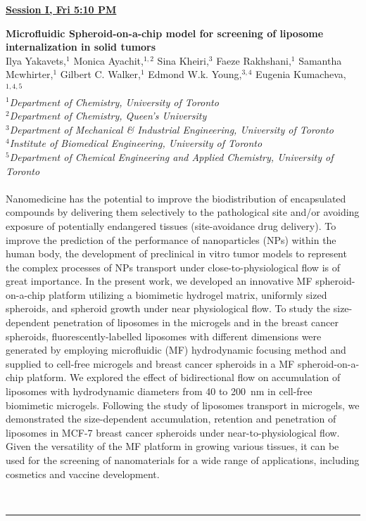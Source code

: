 \documentclass[titlepage,oneside,openany,10pt]{book}
\newenvironment{oralabs}[4] %
        {
        \begin{flushright}
                \underline{\textbf{#4}}
        \end{flushright}
        \textbf{#1}\\%
        #2\\%
        \textit{#3}\\\\%
        }
        {
        \\
        \noindent\rule{15cm}{0.5pt}%
        }
\begin{document}
\begin{oralabs}
	{Microfluidic Spheroid-on-a-chip model for screening of liposome internalization in solid tumors}
	{Ilya Yakavets,$^{1}$ Monica Ayachit,$^{1,2}$ Sina Kheiri,$^{3}$ Faeze Rakhshani,$^{1}$ Samantha Mcwhirter,$^{1}$ Gilbert C. Walker,$^{1}$ Edmond W.k. Young,$^{3,4}$ Eugenia Kumacheva,$^{1,4,5}$}
	{
	$^1$Department of Chemistry, University of Toronto\\
	$^2$Department of Chemistry, Queen's University\\
	$^3$Department of Mechanical \& Industrial Engineering, University of Toronto\\
	$^4$Institute of Biomedical Engineering, University of Toronto\\
	$^5$Department of Chemical Engineering and Applied Chemistry, University of Toronto
	}
	{Session I, Fri 5:10 PM}
	Nanomedicine has the potential to improve the biodistribution of encapsulated compounds by delivering them selectively to the pathological site and/or avoiding exposure of potentially endangered tissues (site-avoidance drug delivery). To improve the prediction of the performance of nanoparticles (NPs) within the human body, the development of preclinical in vitro tumor models to represent the complex processes of NPs transport under close-to-physiological flow is of great importance. In the present work, we developed an innovative MF spheroid-on-a-chip platform utilizing a biomimetic hydrogel matrix, uniformly sized spheroids, and spheroid growth under near physiological flow. To study the size-dependent penetration of liposomes in the microgels and in the breast cancer spheroids, fluorescently-labelled liposomes with different dimensions were generated by employing microfluidic (MF) hydrodynamic focusing method and supplied to cell-free microgels and breast cancer spheroids in a MF spheroid-on-a-chip platform. We explored the effect of bidirectional flow on accumulation of liposomes with hydrodynamic diameters from 40 to 200~nm in cell-free biomimetic microgels. Following the study of liposomes transport in microgels, we demonstrated the size-dependent accumulation, retention and penetration of liposomes in MCF-7 breast cancer spheroids under near-to-physiological flow. Given the versatility of the MF platform in growing various tissues, it can be used for the screening of nanomaterials for a wide range of applications, including cosmetics and vaccine development.
	\label{YakavetsI}
\end{oralabs}
\end{document}
